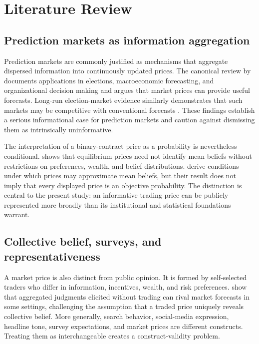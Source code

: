 \section{Literature Review}

\subsection{Prediction markets as information aggregation}

Prediction markets are commonly justified as mechanisms that aggregate dispersed information into continuously updated prices. The canonical review by \citet{wolfers2004prediction} documents applications in elections, macroeconomic forecasting, and organizational decision making and argues that market prices can provide useful forecasts. Long-run election-market evidence similarly demonstrates that such markets may be competitive with conventional forecasts \citep{berg2008accuracy}. These findings establish a serious informational case for prediction markets and caution against dismissing them as intrinsically uninformative.

The interpretation of a binary-contract price as a probability is nevertheless conditional. \citet{manski2006prediction} shows that equilibrium prices need not identify mean beliefs without restrictions on preferences, wealth, and belief distributions. \citet{wolfers2006interpreting} derive conditions under which prices may approximate mean beliefs, but their result does not imply that every displayed price is an objective probability. The distinction is central to the present study: an informative trading price can be publicly represented more broadly than its institutional and statistical foundations warrant.

\subsection{Collective belief, surveys, and representativeness}

A market price is also distinct from public opinion. It is formed by self-selected traders who differ in information, incentives, wealth, and risk preferences. \citet{dana2019markets} show that aggregated judgments elicited without trading can rival market forecasts in some settings, challenging the assumption that a traded price uniquely reveals collective belief. More generally, search behavior, social-media expression, headline tone, survey expectations, and market prices are different constructs. Treating them as interchangeable creates a construct-validity problem.

